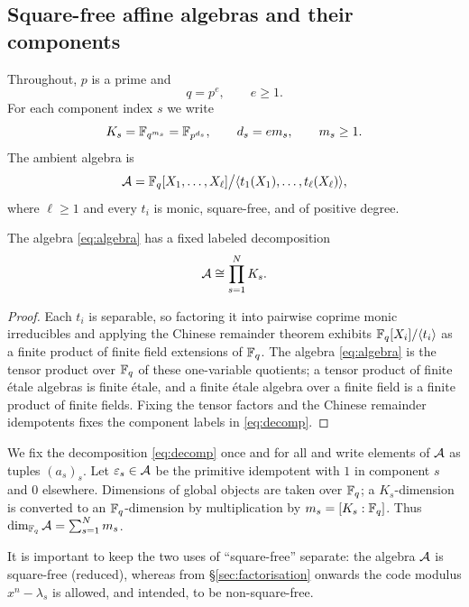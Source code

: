 \subsection{Square-free affine algebras and their components}\label{sec:setup}

Throughout, $p$ is a prime and
\[
q=p^e,\qquad e\geq 1.
\]
For each component index $s$ we write
\[
K_s=\mathbb F_{q^{m_s}}=\mathbb F_{p^{d_s}},\qquad d_s=em_s,\qquad m_s\geq 1.
\]
The ambient algebra is
\begin{equation}\label{eq:algebra}
\mathcal A=\mathbb F_q[X_1,\ldots,X_\ell]
 \big/\langle t_1(X_1),\ldots,t_\ell(X_\ell)\rangle,
\end{equation}
where $\ell\geq1$ and every $t_i$ is monic, square-free, and of positive degree.

\begin{proposition}\label{prop:decomposition}
The algebra \eqref{eq:algebra} has a fixed labeled decomposition
\begin{equation}\label{eq:decomp}
\mathcal A\cong\prod_{s=1}^{N}K_s .
\end{equation}
\end{proposition}

\begin{proof}
Each $t_i$ is separable, so factoring it into pairwise coprime monic irreducibles
and applying the Chinese remainder theorem exhibits
$\mathbb F_q[X_i]/\langle t_i\rangle$ as a finite product of finite field extensions of
$\mathbb F_q$.  The algebra \eqref{eq:algebra} is the tensor product over $\mathbb F_q$ of
these one-variable quotients; a tensor product of finite \'{e}tale algebras is
finite \'{e}tale, and a finite \'{e}tale algebra over a finite field is a finite
product of finite fields.  Fixing the tensor factors and the Chinese remainder
idempotents fixes the component labels in \eqref{eq:decomp}.
\end{proof}

We fix the decomposition \eqref{eq:decomp} once and for all and write elements of
$\mathcal A$ as tuples $(a_s)_s$.  Let $\varepsilon_s\in\mathcal A$ be the primitive idempotent
with $1$ in component $s$ and $0$ elsewhere.  Dimensions of global objects are
taken over $\mathbb F_q$; a $K_s$-dimension is converted to an $\mathbb F_q$-dimension by
multiplication by $m_s=[K_s:\mathbb F_q]$.  Thus
$\dim_{\mathbb F_q}\mathcal A=\sum_{s=1}^{N}m_s$.

It is important to keep the two uses of ``square-free'' separate: the algebra
$\mathcal A$ is square-free (reduced), whereas from \S\ref{sec:factorisation} onwards the
code modulus $x^n-\lambda_s$ is allowed, and intended, to be non-square-free.

